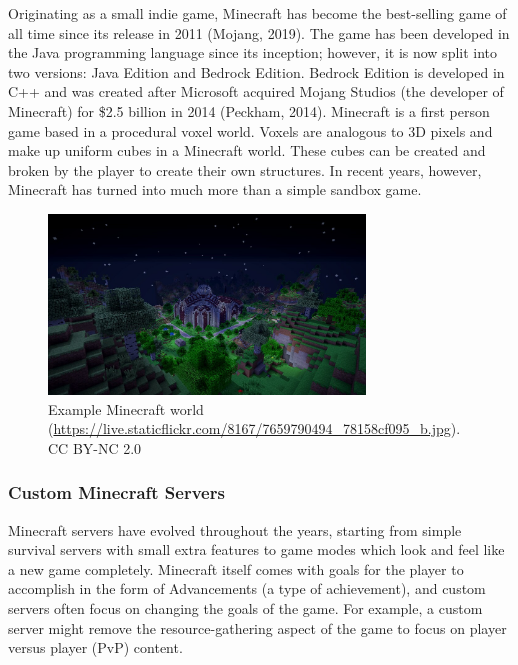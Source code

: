 \documentclass[12pt]{article}
\begin{document}
\begin{onehalfspacing}
Originating as a small indie game, Minecraft has become the best-selling
game of all time since its release in 2011 \parencite{mojang2019}(Mojang, 2019). The game has
been developed in the Java programming language since its inception;
however, it is now split into two versions: Java Edition and Bedrock
Edition. Bedrock Edition is developed in C++ and was created after
Microsoft acquired Mojang Studios (the developer of Minecraft) for \$2.5
billion in 2014 \parencite{peckham2014}(Peckham, 2014). Minecraft is a first person game based
in a procedural voxel world. Voxels are analogous to 3D pixels and make
up uniform cubes in a Minecraft world. These cubes can be created and
broken by the player to create their own structures. In recent years,
however, Minecraft has turned into much more than a simple sandbox game.



\begin{figure}[h] 
    \centering
    \includegraphics[width=0.75\textwidth]{media/media/image2.jpg} 
    \caption{Example Minecraft world \\ (\href{https://live.staticflickr.com/8167/7659790494_78158cf095_b.jpg}{{https://live.staticflickr.com/8167/7659790494\_78158cf095\_b.jpg}}). CC BY-NC 2.0} 
    \label{fig:2_4_1} 
\end{figure}

\subsubsection{Custom Minecraft Servers}

Minecraft servers have evolved throughout the years, starting from
simple survival servers with small extra features to game modes which
look and feel like a new game completely. Minecraft itself comes with
goals for the player to accomplish in the form of Advancements (a type
of achievement), and custom servers often focus on changing the goals of
the game. For example, a custom server might remove the
resource-gathering aspect of the game to focus on player versus player
(PvP) content.


\end{onehalfspacing}
\end{document}
